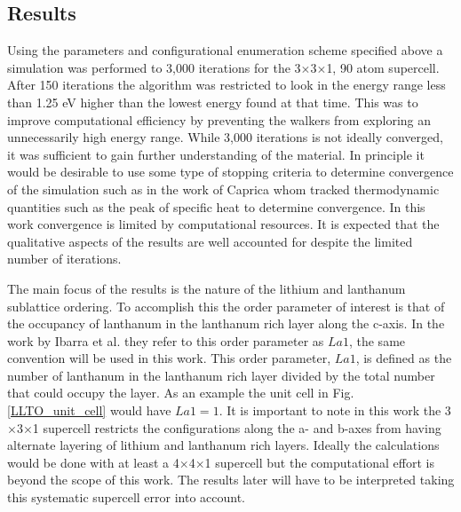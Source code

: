 \documentclass[aps,pre,reprint,superscriptaddress,showkeys]{revtex4-1}
\begin{document}
\subsection{Results}
  Using the parameters and configurational enumeration scheme specified above a simulation was performed to 3,000 iterations for  the 3$\times$3$\times$1,  90 atom supercell. After 150 iterations the algorithm was restricted to look  in the energy range less than 1.25 eV higher than the lowest energy found at that time. This was to improve computational efficiency by preventing the walkers from exploring an unnecessarily high energy range. While 3,000 iterations is not ideally converged, it was sufficient to gain further understanding of the material. In principle it would be desirable to use some type of stopping criteria to determine convergence of the simulation such as in the work of Caprica\cite{halting_wang_and_landau} whom tracked thermodynamic quantities such as the peak of specific heat to determine convergence. In this work convergence is limited by computational resources.   
It is expected that the qualitative aspects of the results are well accounted for despite the limited number of iterations. 
  
The main focus of the results is the nature of the lithium and lanthanum sublattice ordering. To accomplish this the order parameter of interest is that of the occupancy of lanthanum in the lanthanum rich layer along the c-axis.  In the work by Ibarra et al. \cite{P4mmmstrucuture} they refer to this order parameter as $La1$, the same convention will be used in this work. This order parameter, $La1$, is defined as the number of lanthanum in the lanthanum rich layer divided by the total number that could occupy the layer. As an example the unit cell in Fig. \ref{LLTO_unit_cell} would have $La1=1$. It is important to note in this work the 3$\times$3$\times$1 supercell restricts the configurations along the a- and b-axes from having alternate layering of lithium and lanthanum rich layers. Ideally the calculations would be done with at least a 4$\times$4$\times$1 supercell but the computational effort is beyond the scope of this work. The results later will have to be interpreted taking this systematic supercell error into account.  
  
\end{document}
